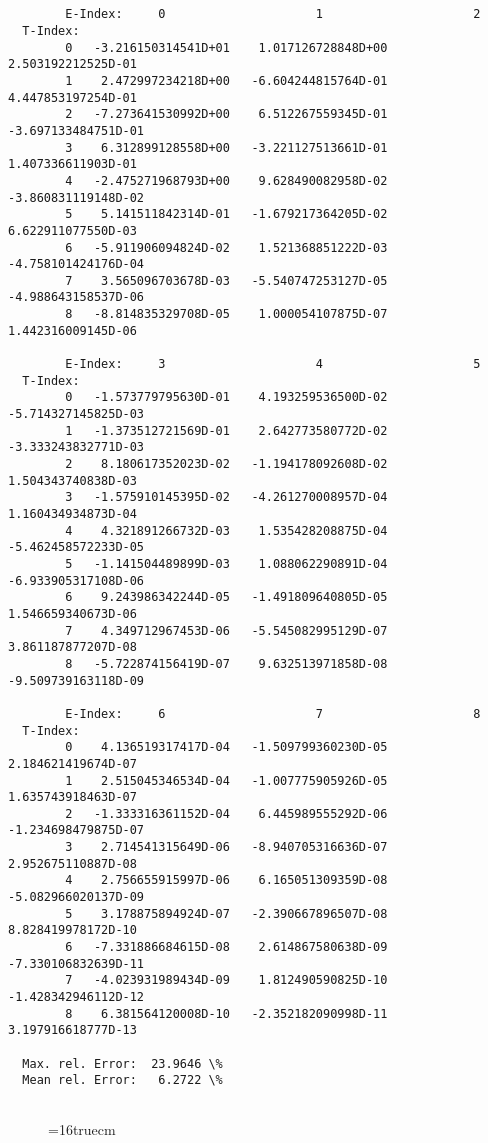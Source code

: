 \documentclass[12pt,dvipdfmx]{article}
\begin{document}
\begin{small}\begin{verbatim}


        E-Index:     0                     1                     2
  T-Index:
        0   -3.216150314541D+01    1.017126728848D+00    2.503192212525D-01
        1    2.472997234218D+00   -6.604244815764D-01    4.447853197254D-01
        2   -7.273641530992D+00    6.512267559345D-01   -3.697133484751D-01
        3    6.312899128558D+00   -3.221127513661D-01    1.407336611903D-01
        4   -2.475271968793D+00    9.628490082958D-02   -3.860831119148D-02
        5    5.141511842314D-01   -1.679217364205D-02    6.622911077550D-03
        6   -5.911906094824D-02    1.521368851222D-03   -4.758101424176D-04
        7    3.565096703678D-03   -5.540747253127D-05   -4.988643158537D-06
        8   -8.814835329708D-05    1.000054107875D-07    1.442316009145D-06

        E-Index:     3                     4                     5
  T-Index:
        0   -1.573779795630D-01    4.193259536500D-02   -5.714327145825D-03
        1   -1.373512721569D-01    2.642773580772D-02   -3.333243832771D-03
        2    8.180617352023D-02   -1.194178092608D-02    1.504343740838D-03
        3   -1.575910145395D-02   -4.261270008957D-04    1.160434934873D-04
        4    4.321891266732D-03    1.535428208875D-04   -5.462458572233D-05
        5   -1.141504489899D-03    1.088062290891D-04   -6.933905317108D-06
        6    9.243986342244D-05   -1.491809640805D-05    1.546659340673D-06
        7    4.349712967453D-06   -5.545082995129D-07    3.861187877207D-08
        8   -5.722874156419D-07    9.632513971858D-08   -9.509739163118D-09

        E-Index:     6                     7                     8
  T-Index:
        0    4.136519317417D-04   -1.509799360230D-05    2.184621419674D-07
        1    2.515045346534D-04   -1.007775905926D-05    1.635743918463D-07
        2   -1.333316361152D-04    6.445989555292D-06   -1.234698479875D-07
        3    2.714541315649D-06   -8.940705316636D-07    2.952675110887D-08
        4    2.756655915997D-06    6.165051309359D-08   -5.082966020137D-09
        5    3.178875894924D-07   -2.390667896507D-08    8.828419978172D-10
        6   -7.331886684615D-08    2.614867580638D-09   -7.330106832639D-11
        7   -4.023931989434D-09    1.812490590825D-10   -1.428342946112D-12
        8    6.381564120008D-10   -2.352182090998D-11    3.197916618777D-13

  Max. rel. Error:  23.9646 \%
  Mean rel. Error:   6.2722 \%


\end{verbatim}\end{small}
\begin{figure} \label{2.3.2a}
\epsfxsize=16truecm
\end{figure}
\newpage
\end{document}
